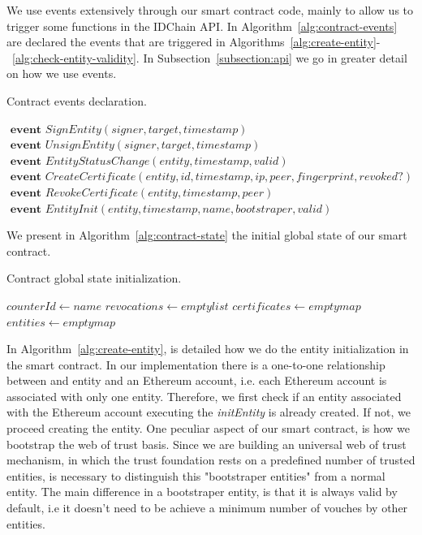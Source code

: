 We use events extensively through our smart contract code, mainly to allow us to trigger some functions in the IDChain API.
In Algorithm~\ref{alg:contract-events} are declared the events that are triggered in Algorithms~\ref{alg:create-entity}-~\ref{alg:check-entity-validity}.
In Subsection~\ref{subsection:api} we go in greater detail on how we use events.

\begin{algorithm}
  \caption{Contract events declaration.}
  \label{alg:contract-events}
  \begin{algorithmic}
    \State $\textbf{ event } SignEntity(signer, target, timestamp)$
    \State $\textbf{ event } UnsignEntity(signer, target, timestamp)$
    \State $\textbf{ event } EntityStatusChange(entity, timestamp, valid)$
    \State $\textbf{ event } CreateCertificate(entity, id, timestamp, ip, peer, fingerprint, revoked?)$
    \State $\textbf{ event } RevokeCertificate(entity, timestamp, peer)$
    \State $\textbf{ event } EntityInit(entity, timestamp, name, bootstraper, valid)$
  \end{algorithmic}
\end{algorithm}

We present in Algorithm~\ref{alg:contract-state} the initial global state of our smart contract.

\begin{algorithm}
  \caption{Contract global state initialization.}
  \label{alg:contract-state}
  \begin{algorithmic}
    \State $counterId \gets name$ 
    \State $revocations \gets empty list$ 
    \State $certificates \gets empty map$ 
    \State $entities \gets empty map$ 
  \end{algorithmic}
\end{algorithm}

In Algorithm~\ref{alg:create-entity}, is detailed how we do the entity initialization in the smart contract.
In our implementation there is a one-to-one relationship between and entity and an Ethereum account, i.e. each Ethereum account is associated with only one entity.
Therefore, we first check if an entity associated with the Ethereum account executing the \textit{initEntity} is already created.
If not, we proceed creating the entity.
One peculiar aspect of our smart contract, is how we bootstrap the web of trust basis.
Since we are building an universal web of trust mechanism, in which the trust foundation rests on a predefined number of trusted entities, is necessary to distinguish this "bootstraper entities" from a normal entity.
The main difference in a bootstraper entity, is that it is always valid by default, i.e it doesn't need to be achieve a minimum number of vouches by other entities.

